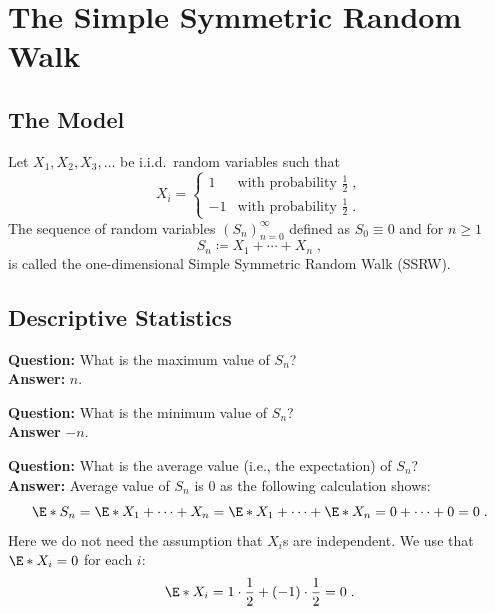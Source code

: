 \chapter{The Simple Symmetric Random Walk}

\section{The Model}

Let $X_1,X_2,X_3,\ldots$ be i.i.d.\ random variables such that
\begin{equation}
X_i = \begin{cases}
1 & \mbox{with probability } \frac{1}{2} \;,\\
-1 & \mbox{with probability } \frac{1}{2} \;.
\end{cases}
\end{equation}
The sequence of random variables $\left(S_n\right)_{n=0}^\infty$ defined as $S_0\equiv 0$ and for $n\geq 1$
\begin{equation}
S_n \coloneqq X_1+\cdots+X_n \;,
\end{equation}
is called the one-dimensional Simple Symmetric Random Walk (SSRW).

\section{Descriptive Statistics}

\textbf{Question:} What is the maximum value of $S_n$?\\
\textbf{Answer:} $n$.\\

\medskip

\noindent\textbf{Question:} What is the minimum value of $S_n$?\\
\textbf{Answer} $-n$.\\

\medskip 

\noindent\textbf{Question:} What is the average value (i.e., the expectation) of $S_n$?\\
\textbf{Answer:} Average value of $S_n$ is $0$ as the following calculation shows:
\begin{equation}
\E*{S_n}=\E*{X_1+\cdots+X_n}=\E*{X_1}+\cdots+\E*{X_n}=0+\cdots+0=0\;.
\end{equation}
Here we do not need the assumption that $X_i$s are independent. We use that $\E*{X_i}=0$ for each $i$:
\begin{equation}
\E*{X_i}=1\cdot\frac{1}{2}+(-1)\cdot\frac{1}{2}=0\;.
\end{equation}

